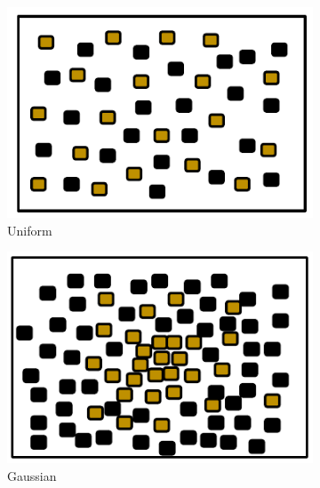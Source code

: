 \documentclass[preprint,12pt]{elsarticle}
\begin{document}
\begin{figure} [htb]
        \centering
        \begin{subfigure}[b]{0.21\textwidth}
                \includegraphics[width=\textwidth]{figures/uniformenv.pdf}
                \caption{Uniform}
                \label{fig:uniformenv}
        \end{subfigure}%
		\begin{subfigure}[b]{0.2\textwidth}
                        \includegraphics[width=\textwidth]{figures/gaussianenv}
                        \caption{Gaussian}
                        \label{fig:gaussianenv}
       \end{subfigure}
        \begin{subfigure}[b]{0.205\textwidth}

\end{subfigure}
\end{figure}
\end{document}
